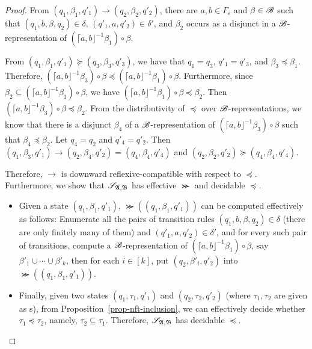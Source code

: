 \begin{proof}
From $(q_1, \beta_1, q'_1) \rightarrow (q_2, \beta_2, q'_2)$, there are $a, b \in \Gamma_\varepsilon$ and $\beta \in {\mathscr{B} }$ such that $(q_1, b, \beta, q_2) \in \delta$, $(q'_1, a, q'_2) \in \delta'$, and $\beta_2$ occurs as a disjunct in a ${\mathscr{B} }$-representation of $( \lceil a, b \rfloor^{-1} \beta_1) \circ \beta$. 

From $(q_1, \beta_1, q'_1) \succeq (q_3, \beta_3, q'_3)$, we have that $q_1 = q_3$, $q'_1 = q'_3$, and $\beta_3 \preceq \beta_1$. Therefore, $ ( \lceil a, b \rfloor^{-1} \beta_3) \circ \beta \preceq ( \lceil a, b \rfloor^{-1} \beta_1) \circ \beta$. Furthermore, since $\beta_2 \subseteq ( \lceil a, b \rfloor^{-1} \beta_1) \circ \beta $, we have $( \lceil a, b \rfloor^{-1} \beta_1) \circ \beta  \preceq \beta_2$. Then $ ( \lceil a, b \rfloor^{-1} \beta_3)  \circ \beta \preceq \beta_2$. From the distributivity of $\preceq$ over ${\mathscr{B} }$-representations, we know that there is a disjunct $\beta_4$ of a ${\mathscr{B} }$-representation of $( \lceil a, b \rfloor^{-1} \beta_3)  \circ \beta$ such that $\beta_4 \preceq \beta_2$.
Let $q_4 = q_2$ and $q'_4= q'_2$. Then $(q_1, \beta_3, q'_1) \rightarrow (q_2, \beta_4, q'_2)=(q_4, \beta_4, q'_4)$ and $(q_2, \beta_2, q'_2) \succeq (q_4, \beta_4, q'_4)$.


Therefore, $\rightarrow$ is downward reflexive-compatible with respect to $\preceq$. Furthermore, we show that $\mathscr{S}_{{\mathfrak{A} },{\mathfrak{B} }}$ has effective $\Succ$ and decidable $\preceq$.
\begin{itemize}
	\item Given a state $(q_1, \beta_1, q'_1)$, $\Succ((q_1, \beta_1, q'_1))$ can be computed effectively as follows: Enumerate all the pairs of transition rules $(q_1, b, \beta, q_2) \in \delta$ (there are only finitely many of them) and $(q'_1, a, q'_2) \in \delta'$, and for every such pair of transitions, compute a ${\mathscr{B} }$-representation of $( \lceil a, b \rfloor^{-1} \beta_1) \circ \beta$, say $\beta'_1 \cup \cdots \cup \beta'_k$, then for each $i \in [k]$, put $(q_2, \beta'_i, q'_2)$ into $\Succ((q_1, \beta_1, q'_1))$.
	\item Finally, given two states $(q_1, \tau_1, q'_1)$ and $(q_2, \tau_2, q'_2)$ (where $\tau_1, \tau_2$ are given as {\NFT}s), from Proposition~\ref{prop-nft-inclusion}, we can effectively decide whether $\tau_1 \preceq \tau_2$, namely, $\tau_2 \subseteq \tau_1$. Therefore, $\mathscr{S}_{{\mathfrak{A} },{\mathfrak{B} }}$ has decidable $\preceq$.
\end{itemize}


\end{proof}

